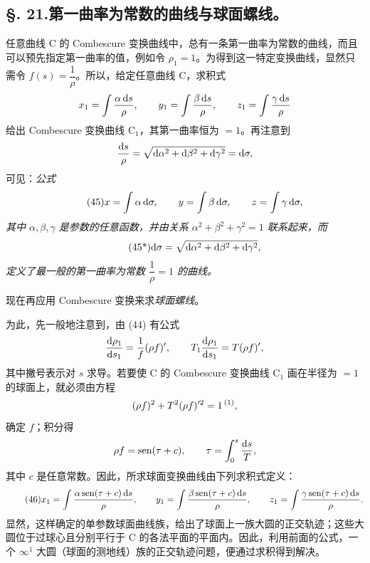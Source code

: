 \subsection*{\S. 21.\quad 第一曲率为常数的曲线与球面螺线。}
任意曲线 C 的 Combescure 变换曲线中，总有一条第一曲率为常数的曲线，而且可以预先指定第一曲率的值，例如令 \(\rho_1=1\)。为得到这一特定变换曲线，显然只需令 \(f(s)=\dfrac{1}{\rho}\)。所以，给定任意曲线 C，求积式
\[
x_1=\int\frac{\alpha\,\mathrm{d} s}{\rho},
\qquad
y_1=\int\frac{\beta\,\mathrm{d} s}{\rho},
\qquad
z_1=\int\frac{\gamma\,\mathrm{d} s}{\rho}
\]
给出 Combescure 变换曲线 C\(_1\)，其第一曲率恒为 \(=1\)。再注意到
\[
\frac{\mathrm{d} s}{\rho}=\sqrt{\mathrm{d}\alpha^2+\mathrm{d}\beta^2+\mathrm{d}\gamma^2}=\mathrm{d}\sigma,
\]
可见：\emph{公式}
\begin{equation}\tag{45}
x=\int\alpha\,\mathrm{d}\sigma,
\qquad y=\int\beta\,\mathrm{d}\sigma,
\qquad z=\int\gamma\,\mathrm{d}\sigma,
\end{equation}
\emph{其中 \(\alpha,\beta,\gamma\) 是参数的任意函数，并由关系 \(\alpha^2+\beta^2+\gamma^2=1\) 联系起来，而}
\begin{equation}\tag{45*}
\mathrm{d}\sigma=\sqrt{\mathrm{d}\alpha^2+\mathrm{d}\beta^2+\mathrm{d}\gamma^2},
\end{equation}
\emph{定义了最一般的第一曲率为常数 \(\dfrac{1}{\rho}=1\) 的曲线。}

现在再应用 Combescure 变换来求\emph{球面螺线}。

为此，先一般地注意到，由 (44) 有公式
\[
\frac{\mathrm{d}\rho_1}{\mathrm{d} s_1}=\frac{1}{f}(\rho f)',
\qquad
T_1\frac{\mathrm{d}\rho_1}{\mathrm{d} s_1}=T(\rho f)',
\]
其中撇号表示对 \(s\) 求导。若要使 C 的 Combescure 变换曲线 C\(_1\) 画在半径为 \(=1\) 的球面上，就必须由方程
\[
(\rho f)^2+T^2(\rho f)'^2=1\,\srcfnmark{1},
\]
确定 \(f\)；积分得
\[
\rho f=\operatorname{sen}(\tau+c),
\qquad
\tau=\int_0^s\frac{\mathrm{d} s}{T},
\]
其中 \(c\) 是任意常数。因此，所求球面变换曲线由下列求积式定义：
\begin{equation}\tag{46}
x_1=\int\frac{\alpha\operatorname{sen}(\tau+c)\,\mathrm{d} s}{\rho},
\qquad
 y_1=\int\frac{\beta\operatorname{sen}(\tau+c)\,\mathrm{d} s}{\rho},
\qquad
 z_1=\int\frac{\gamma\operatorname{sen}(\tau+c)\,\mathrm{d} s}{\rho}.
\end{equation}
显然，这样确定的单参数球面曲线族，给出了球面上一族大圆的正交轨迹；这些大圆位于过球心且分别平行于 C 的各法平面的平面内。因此，利用前面的公式，一个 \(\infty^1\) 大圆（球面的测地线）族的正交轨迹问题，便通过求积得到解决。

